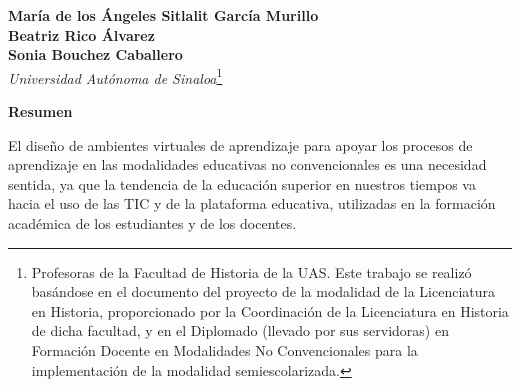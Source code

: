 %

\thispagestyle{empty}
{\par}
\setcounter{footnote}{0}
\renewcommand*{\thefootnote}{\fnsymbol{footnote}}
\setcounter{footnote}{0}

\bigskip
\begin{center}
{\bfseries María de los
Ángeles Sitlalit García Murillo\\
Beatriz Rico Álvarez\\
Sonia Bouchez Caballero}\\
{\itshape Universidad Autónoma de Sinaloa}\footnote{Profesoras de
la Facultad de Historia de la UAS. Este trabajo se realizó basándose en el documento del  proyecto de la modalidad de la Licenciatura en Historia,  proporcionado por  la Coordinación de la Licenciatura en Historia de dicha facultad, y en el Diplomado (llevado por sus servidoras) en Formación Docente en Modalidades No Convencionales  para la implementación de la modalidad semiescolarizada.}
\end{center}

\renewcommand*{\thefootnote}{\arabic{footnote}}
\setcounter{footnote}{0}

\bigskip
\textbf{Resumen}

El diseño de ambientes virtuales de aprendizaje para
apoyar los procesos de aprendizaje en las modalidades educativas no
convencionales es una necesidad sentida, ya que la tendencia de la
educación superior en nuestros tiempos va hacia el uso de las TIC y de la
plataforma educativa, utilizadas en la formación académica de los
estudiantes y de los docentes.

